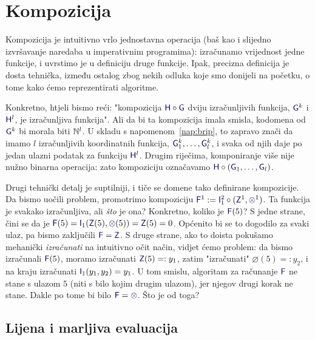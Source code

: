 \section{Kompozicija}

Kompozicija je intuitivno vrlo jednostavna operacija (baš kao i slijedno izvršavanje naredaba u imperativnim programima): izračunamo vrijednost jedne funkcije, i uvrstimo je u definiciju druge funkcije. Ipak, precizna definicija je dosta tehnička, između ostalog zbog nekih odluka koje smo donijeli na početku, o tome kako ćemo reprezentirati algoritme.

Konkretno, htjeli bismo reći: "kompozicija $\f H\circ\f G$ dviju izračunljivih funkcija, $\f G^k$ i $\f H^l$, je izračunljiva funkcija". Ali da bi ta kompozicija imala smisla, kodomena od $\f G^k$ bi morala biti ${\mathbb N}^l$. U skladu s napomenom~\ref{nap:brip}, to zapravo znači da imamo $l$ izračunljivih koordinatnih funkcija, $\f G_1^k,\dotsc,\f G_l^k$, i svaka od njih daje po jedan ulazni podatak za funkciju $\f H^l$. Drugim riječima, komponiranje više nije nužno binarna operacija: zato kompoziciju označavamo $\f H\circ(\f G_1,\dotsc,\f G_l)$.

Drugi tehnički detalj je suptilniji, i tiče se domene tako definirane kompozicije. Da bismo uočili problem, promotrimo kompoziciju $\f F^1:=\f I_1^2\circ(\f Z^1,\varnothing^1)$. Ta funkcija je svakako izračunljiva, ali \emph{što} je ona? Konkretno, koliko je $\f F(5)$? S jedne strane, čini se da je $\f F(5)=\f I_1(\f Z(5),\varnothing(5))=\f Z(5)=0$. Općenito bi se to dogodilo za svaki ulaz, pa bismo zaključili $\f F =\f Z$. S druge strane, ako to doista pokušamo mehanički \emph{izračunati} na intuitivno očit način, vidjet ćemo problem: da bismo izračunali $\f F(5)$, moramo izračunati $\f Z(5)=:y_1$, zatim "izračunati" $\varnothing(5)=:y_2$, i na kraju izračunati $\f I_1(y_1,y_2)=y_1$. U tom smislu, algoritam za računanje $\f F$ ne stane s ulazom $5$ (niti s bilo kojim drugim ulazom), jer njegov drugi korak ne stane. Dakle po tome bi bilo $\f F=\varnothing$. Što je od toga?

\subsection{Lijena i marljiva evaluacija}

